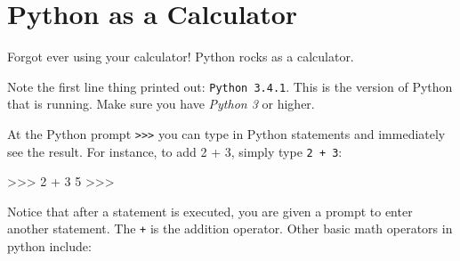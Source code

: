 \documentclass[11pt]{cselabheader}
\begin{document}
\pagebreak
\section{Python as a Calculator}
\label{sec:python-calc}
Forgot ever using your calculator! Python rocks as a calculator.


Note the first line thing printed out: \texttt{Python 3.4.1}. This is the
version of Python that is running. Make sure you have \emph{Python 3} or higher.

At the Python prompt \texttt{>>>} you can type in Python statements and
immediately see the result. For instance, to add 2 + 3, simply type \texttt{2 +
3}: 

\begin{python3code}
>>> 2 + 3
5
>>>
\end{python3code}

Notice that after a statement is executed, you are given a prompt to enter
another statement. The \texttt{+} is the addition operator. Other basic math
operators in python include:
\end{document}
